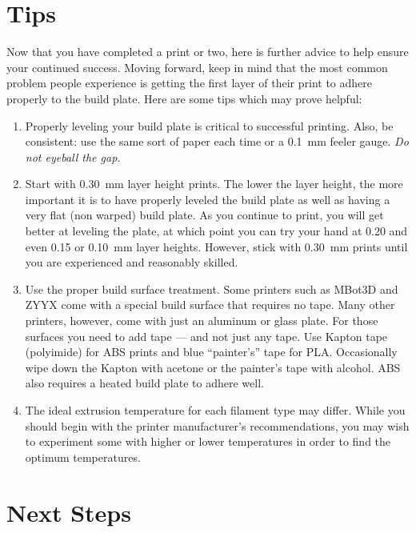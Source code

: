 
\section{Tips}

Now that you have completed a print or two, here is further advice to help ensure your continued success.  Moving forward, keep in mind
that the most common problem people experience is getting the first layer
of their print to adhere properly to the build plate.  Here are some tips
which may prove helpful:

\begin{enumerate}
\item Properly leveling your build plate is critical to successful
printing.  Also, be consistent: use the same sort of paper each time or a
0.1~mm feeler gauge.  \emph{Do not eyeball the gap.}
\item Start with 0.30~mm layer height prints.  The lower the layer height, the
more important it is to have properly leveled the build plate as well as having a very flat
(non warped) build plate.  As you continue to print, you will get better
at leveling the plate, at which point you can try your hand at 0.20 and even 0.15 or
0.10~mm layer heights.  However, stick with 0.30~mm prints until you are experienced and reasonably skilled.
\item Use the proper build surface treatment.  Some printers such as MBot3D
and ZYYX come with a special build surface that requires no tape. Many other
printers, however, come with just an aluminum or glass plate.  For those
surfaces you need to add tape --- and not just any tape.  Use Kapton tape
(polyimide) for ABS prints and blue ``painter's'' tape for PLA.  Occasionally
wipe down the Kapton with acetone or the painter's tape with alcohol.  ABS
also requires a heated build plate to adhere well.
\item The ideal extrusion temperature for each filament type may differ.  While you should begin with the printer manufacturer's recommendations, you may wish to experiment some with higher or lower temperatures in order to find the optimum temperatures.
\end{enumerate}

\ifdefined\luluflag
\pagebreak[4]
\fi


\section{Next Steps}

